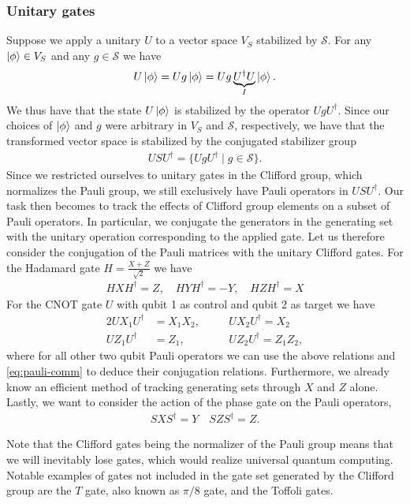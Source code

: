 \subsubsection{Unitary gates}
Suppose we apply a unitary $U$ to a vector space $V_S$ stabilized by
$\mathcal{S}$. For any $\ket{\phi} \in V_S$ and any $g \in \mathcal{S}$ we have
\begin{align}
  U\ket{\phi} = U g \ket{\phi} = U g \underbrace{U^\dagger U}_{I} \ket{\phi}
.\end{align}
We thus have that the state $U\ket{\phi}$ is stabilized by the operator
$UgU^\dagger$. Since our choices of $\ket{\phi}$ and $g$ were arbitrary in
$V_S$ and $\mathcal{S}$, respectively, we have that the transformed vector
space is stabilized by the conjugated stabilizer group
\begin{align}
  USU^\dagger = \{ UgU^\dagger \mid g \in \mathcal{S}\}
.\end{align}
Since we restricted ourselves to unitary gates in the Clifford group, which
normalizes the Pauli group, we still exclusively have Pauli operators in
$USU^\dagger$. Our task then becomes to track the effects of Clifford group
elements on a subset of Pauli operators. In particular, we conjugate the
generators in the generating set with the unitary operation corresponding to
the applied gate. Let us therefore consider the
conjugation of the Pauli matrices with the unitary Clifford gates.
For the Hadamard gate $H = \frac{X+Z}{\sqrt{2}}$ we have
\begin{align}
  HXH^\dagger = Z, \quad HYH^\dagger = -Y, \quad HZH^\dagger = X
\end{align}
For the CNOT gate $U$ with qubit 1 as control and qubit 2 as target we have
\begin{alignat}{2}
  UX_1U^\dagger &= X_1X_2, \quad &&UX_2U^\dagger = X_2 \label{eq:cnot-x}\\
  UZ_1U^\dagger &= Z_1, \quad &&UZ_2U^\dagger = Z_1Z_2
,\end{alignat}
where for all other two qubit Pauli operators we can use the above relations
and \cref{eq:pauli-comm} to
deduce their conjugation relations. Furthermore, we already know an efficient method
of tracking generating sets through $X$ and $Z$ alone.
Lastly, we want to consider the action of the phase gate on the Pauli
operators,
\begin{align}
  SXS^\dagger = Y \quad SZS^\dagger = Z
.\end{align}

Note that the Clifford gates being the normalizer of the Pauli group means that
we will inevitably lose gates, which would realize universal quantum computing.
Notable examples of gates not included in the gate set generated by the
Clifford group are the $T$ gate, also known as $\pi /8$ gate, and the Toffoli
gates.

